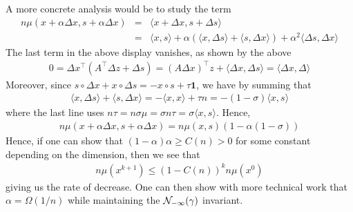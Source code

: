 	A more concrete analysis would be to study the term
	\begin{eqnarray*}
	n \mu(x + \alpha \Delta x, s + \alpha \Delta x)  &=& \langle x + \Delta x ,  s + \Delta s \rangle \\
	&=& \langle x , s \rangle  + \alpha \left(\langle x, \Delta s \rangle + \langle s, \Delta x \rangle \right) + \alpha^2 \langle \Delta s, \Delta x \rangle
	\end{eqnarray*}
	The last term in the above display vanishes, as shown by the above
	\begin{eqnarray}
	0 = \Delta x^\top (A^{\top} \Delta z + \Delta s) = (A\Delta x)^\top z + \langle \Delta x, \Delta s \rangle = \langle \Delta x, \Delta \rangle
	\end{eqnarray}
	Moreover, since $s \circ \Delta x + x \circ \Delta s = - x \circ s + \tau \mathbf{1}$, we have by summing that 
	\begin{eqnarray}
	\langle x, \Delta s \rangle + \langle s, \Delta x \rangle =  - \langle x , x \rangle + \tau n = - (1 - \sigma) \langle x, s \rangle
	\end{eqnarray}
	where the last line uses $n \tau = n \sigma \mu = \sigma n \tau =  \sigma \langle x, s \rangle$. Hence,
	\begin{eqnarray}
	n \mu(x + \alpha \Delta x, s + \alpha \Delta x) = n \mu(x,s) (1 - \alpha(1-\sigma))
	\end{eqnarray}
	Hence, if one can show that $(1-\alpha)\alpha \ge C(n) > 0$ for some constant depending on the dimension, then we see that
	\begin{eqnarray}
	n \mu(x^{k+1}) \le (1 - C(n))^{k} n \mu(x^0)
	\end{eqnarray}
	giving us the rate of decrease. One can then show with more technical work that $\alpha = \Omega(1/n)$ while maintaining the ${\cal N}_{-\infty}(\gamma)$ invariant.
	
	








